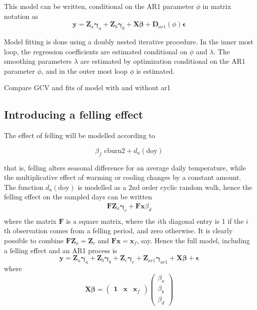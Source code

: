 This model can be written, conditional on the AR1 parameter $\phi$ in matrix notation as
\begin{equation}
  \bm{y} = \bm{Z}_a \bm{\gamma}_a + \bm{Z}_b \bm{\gamma}_b + \bm{X} \bm{\beta} + \bm{D}_{ar1}(\phi)\bm{\epsilon}
\end{equation}

Model fitting is done using a doubly nested iterative procedure. In the inner most loop, the regression coefficients are estimated conditional on $\phi$ and $\lambda$.  The smoothing parameters $\lambda$ are estimated by optimization conditional on the AR1 parameter $\phi$, and in the outer most loop $\phi$ is estimated.

Compare GCV and fits of model with and without ar1





\subsection{Introducing a felling effect}

The effect of felling will be modelled according to

\begin{equation}
  \beta_f \text{ cburn2} + d_a(\text{doy})
\end{equation}

that is, felling alters seasonal difference for an average daily temperature, while the multiplicative effect of warming or cooling changes by a constant amount.  The function $d_a(\text{doy})$ is modelled as a 2nd order cyclic random walk, hence the felling effect on the sampled days can be written
\begin{align}
  \bm{F} \bm{Z}_a \bm{\gamma}_c + \bm{F} \bm{x} \beta_d \\
\end{align}
where the matrix $\bm{F}$ is a square matrix, where the $i$th diagonal entry is 1 if the $i$th observation comes from a felling period, and zero otherwise.  It is clearly possible to combine $\bm{F} \bm{Z}_a = \bm{Z}_c$ and $\bm{F} \bm{x} = \bm{x}_f$, say.  Hence the full model, including a felling effect and an AR1 process is
\begin{equation}
  \bm{y} = \bm{Z}_a \bm{\gamma}_a + \bm{Z}_b \bm{\gamma}_b + \bm{Z}_c \bm{\gamma}_c + \bm{Z}_{ar1} \bm{\gamma}_{ar1} + \bm{X} \bm{\beta} + \bm{\epsilon}
\end{equation}
where
\begin{equation}
  \bm{X} \bm{\beta} = \begin{pmatrix} \bm{1} & \bm{x} & \bm{x}_f \end{pmatrix} \begin{pmatrix} \beta_a \\ \beta_b \\ \beta_d \end{pmatrix} 
\end{equation}

